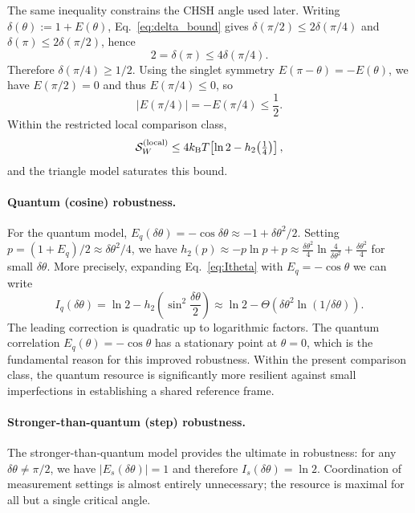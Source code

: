 \documentclass[pra,twocolumn,showpacs,preprintnumbers,amsmath,amssymb,longbibliography,
               superscriptaddress]{revtex4-2}
\begin{document}
{The same inequality constrains the CHSH angle used later.
Writing $\delta(\theta):=1+E(\theta)$, Eq.~\eqref{eq:delta_bound} gives
$\delta(\pi/2)\le 2\delta(\pi/4)$ and
$\delta(\pi)\le 2\delta(\pi/2)$, hence
\[
2=\delta(\pi)\le 4\delta(\pi/4).
\]
Therefore $\delta(\pi/4)\ge 1/2$.
Using the singlet symmetry $E(\pi-\theta)=-E(\theta)$, we have
$E(\pi/2)=0$ and thus $E(\pi/4)\le 0$, so
\begin{equation}
|E(\pi/4)| = -E(\pi/4) \le \frac12.
\label{eq:local_pi_over_4_bound}
\end{equation}
Within the restricted local comparison class,
\begin{equation}
\mathcal S_W^{\rm(local)}
\le 4k_{\mathrm B}T\!\left[\ln2-h_2\!\left(\tfrac14\right)\right],
\label{eq:SW_local_bound}
\end{equation}
and the triangle model saturates this bound.}

\paragraph{Quantum (cosine) robustness.}
{For the quantum model,
$E_q(\delta\theta) = -\cos\delta\theta
  \approx -1 + \delta\theta^2/2$.
Setting
$p = (1 + E_q)/2 \approx \delta\theta^2/4$, we have
$h_2(p) \approx -p\ln p + p
       \approx \frac{\delta\theta^2}{4}
              \ln\!\frac{4}{\delta\theta^2}
             + \frac{\delta\theta^2}{4}$
for small $\delta\theta$.
More precisely, expanding Eq.~\eqref{eq:Itheta} with
$E_q = -\cos\theta$ we can write
\begin{equation}
I_q(\delta\theta)
  = \ln 2 - h_2\!\left(\sin^2\!\frac{\delta\theta}{2}\right)
  \approx \ln 2
    - \Theta(\delta\theta^2 \ln(1/\delta\theta)).
\label{eq:Iq_expansion}
\end{equation}
The leading correction is quadratic up to logarithmic factors.
The quantum correlation $E_q(\theta) = -\cos\theta$ has a stationary
point at $\theta = 0$,
which is the fundamental reason for this improved robustness.}
Within the {present comparison class}, the quantum resource is
significantly more {resilient} against small imperfections in
establishing a shared reference frame.

\paragraph{Stronger-than-quantum (step) robustness.}
The stronger-than-quantum model {provides the ultimate in robustness:
for any $\delta\theta \neq \pi/2$, we have
$|E_s(\delta\theta)| = 1$ and therefore
$I_s(\delta\theta) = \ln 2$.
Coordination} of measurement settings is almost entirely unnecessary{;
the resource is maximal for all but a single critical angle.}
\end{document}
